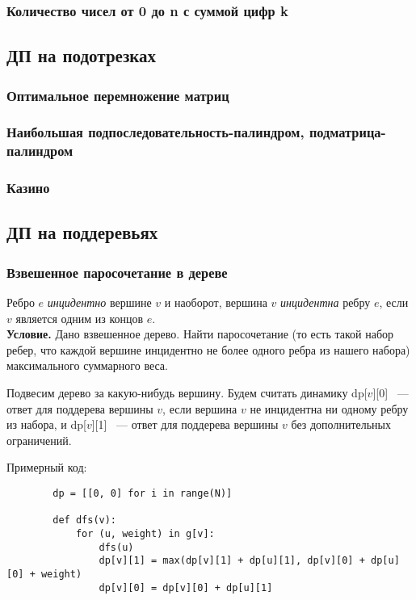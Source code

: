 \documentclass[a4paper,12pt]{article}
\begin{document}
      \subsubsection{Количество чисел от 0 до n с суммой цифр k}
    
    \subsection{ДП на подотрезках}

      \subsubsection{Оптимальное перемножение матриц}

      \subsubsection{Наибольшая подпоследовательность-палиндром, подматрица-палиндром}
      \subsubsection{Казино}

    \subsection{ДП на поддеревьях}

      \subsubsection{Взвешенное паросочетание в дереве}
      Ребро $e$ \emph{инцидентно} вершине $v$ и наоборот, вершина $v$ 
      \emph{инцидентна} ребру $e$, если $v$ является одним из концов $e$.
      \\
      
      \textbf{Условие.} Дано взвешенное дерево. Найти паросочетание (то есть 
      такой набор ребер, что каждой вершине инцидентно не более одного ребра из
      нашего набора) максимального суммарного веса.
      
      Подвесим дерево за какую-нибудь вершину. Будем считать динамику dp[$v$][0] 
      ~--- ответ для поддерева вершины $v$, если вершина $v$ не инцидентна ни 
      одному ребру из набора, и dp[$v$][1] ~--- ответ для поддерева вершины $v$
      без дополнительных ограничений.
      
      Примерный код:
      \begin{lstlisting}
      	dp = [[0, 0] for i in range(N)]
      	
      	def dfs(v):
      	    for (u, weight) in g[v]:
      	        dfs(u)
      	        dp[v][1] = max(dp[v][1] + dp[u][1], dp[v][0] + dp[u][0] + weight)
      	        dp[v][0] = dp[v][0] + dp[u][1]
      	    	
      \end{lstlisting}
	  
\end{document}
